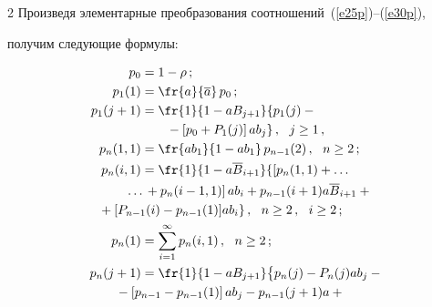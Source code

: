 \begin{multicols}{2}
Произведя  элементарные преобразования соотношений~(\ref{e25p})--(\ref{e30p}),


получим следующие формулы:


\begin{align}


p_0 &= 1-\rho\,; \label{e31p}\\


p_{1}(1) &=\fr{a}{\a}\, p_0\,;\label{e32p}\\


p_{1}(j+1) & = \fr{1}{1-aB_{j+1}}


 \{


p_{1}(j) -{}\notag\\


&\ \ \ \ \ \ {}- \left [ p_0 + P_{1}(j)\right ] ab_j


 \}\,,  \ \ j\ge 1\,,\label{e33p}\\


p_{n}(1,1) & = \fr{ab_1}{1 - ab_1}\, p_{n-1}(2)\,,


\ \ n\ge 2\,; \label{e34p}\\


p_{n}(i,1) & = \fr{1}{1 - a \overline B_{i+1}}


 \{


\left [p_n(1,1)+\ldots \right.\notag\\


&\!\!\!\!\!\!\!\!\left.\ldots {}+p_n(i-1,1)\right ] ab_i +


p_{n-1}(i+1) a \overline B_{i+1} +{}\notag\\


&\!\!\!\!\!\!\!\!\!\!\!\!\!\!\!\!\!\!\!\! {}+[P_{n-1}(i) - p_{n-1}(1)] a b_i  \}\,,


\ \ n\ge 2\,,\ \ i\ge 2\,; \label{e35p}\\


p_{n}(1) & = \sum\limits_{i=1}^\infty p_{n}(i,1)\,,


\ \ n\ge 2\,;                               \label{e36p}\\


p_n(j+1) & = \fr{1}{1 - aB_{j+1}}


\big\{


p_{n}(j) - P_n(j) a b_j - {}\notag\\


&\hspace*{-20pt}{}-\left [ p_{n-1} - p_{n-1}(1)\right ] a b_j -


p_{n-1}(j+1) a +{}\notag\\



\end{align}
\end{multicols}
